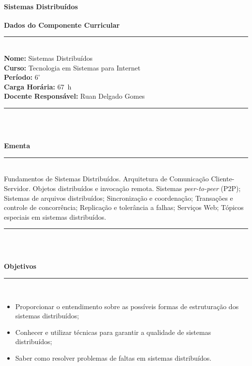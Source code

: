\paragraph{Sistemas Distribu\'idos}

\vspace{-12mm}
\begin{center}\textbf{Dados do Componente Curricular}\end{center}
\vspace{-5mm}
\noindent\rule{16.5cm}{0.4pt}
\\
\textbf{Nome:} Sistemas Distribuídos
\\ 
\textbf{Curso:} Tecnologia em Sistemas para Internet
\\ 
\textbf{Período:} $6^{\circ}$
\\ 
\textbf{Carga Horária:} 67~h
\\ 
\textbf{Docente Responsável:} Ruan Delgado Gomes
\\ 
\noindent\rule{16.5cm}{0.4pt}\\
\\
\vspace{-12mm}
\begin{center}\textbf{Ementa}\end{center}
\vspace{-5mm}
\noindent\rule{16.5cm}{0.4pt}
\\
Fundamentos de Sistemas Distribuídos. Arquitetura de Comunicação Cliente-Servidor. Objetos distribu\'idos e invoca\c{c}\~ao remota. Sistemas \textit{peer-to-peer} (P2P); Sistemas de arquivos distribuídos; Sincronização e coordena\c{c}\~ao; Transações e controle de concorr\^encia; Replicação e tolerância a falhas; Serviços Web; T\'opicos especiais em sistemas distribu\'idos.\\ 
\noindent\rule{16.5cm}{0.4pt}\\
\\
\vspace{-12mm}
\begin{center}\textbf{Objetivos}\end{center}
\vspace{-5mm}
\noindent\rule{16.5cm}{0.4pt}
\\
\begin{itemize}
\item Proporcionar o entendimento sobre as possíveis formas de estruturação dos sistemas distribuídos;
\item Conhecer e utilizar técnicas para garantir a qualidade de sistemas distribuídos;
\item Saber como resolver problemas de faltas em sistemas distribuídos.
\end{itemize} 
